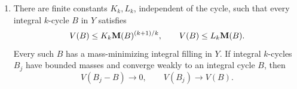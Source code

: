 \begin{theorem}
\begin{enumerate}[label=\textup{(\roman*)}]
\item There are finite constants \(K_k,L_k\), independent of the cycle,
such that every integral \(k\)-cycle \(B\) in \(Y\) satisfies
\begin{equation}
\label{eq:coarse-fillings}
 V(B)\le K_k\mathbf M(B)^{(k+1)/k},\qquad
 V(B)\le L_k\mathbf M(B).
\end{equation}
Every such \(B\) has a mass-minimizing integral filling in \(Y\).
If integral \(k\)-cycles \(B_j\) have bounded masses and converge weakly
to an integral cycle \(B\), then
\begin{equation}
\label{eq:filling-continuity}
 V(B_j-B)\longrightarrow0,
 \qquad V(B_j)\longrightarrow V(B).
\end{equation}
\end{enumerate}
\end{theorem}

